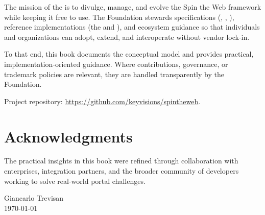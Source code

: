 The mission of the \organization{} is to divulge, manage, and evolve the Spin the Web framework while keeping it free to use. The Foundation stewards specifications (\wbdl, \wbpl, \wbll), reference implementations (the \webspinner and \studio), and ecosystem guidance so that individuals and organizations can adopt, extend, and interoperate without vendor lock-in.

To that end, this book documents the conceptual model and provides practical, implementation-oriented guidance. Where contributions, governance, or trademark policies are relevant, they are handled transparently by the Foundation.

Project repository: \url{https://github.com/keyvisions/spintheweb}.

\section*{Acknowledgments}

The practical insights in this book were refined through collaboration with enterprises, integration partners, and the broader community of developers working to solve real-world portal challenges.

\vspace{1cm}
\hfill Giancarlo Trevisan \\
\hfill \today

\clearpage

